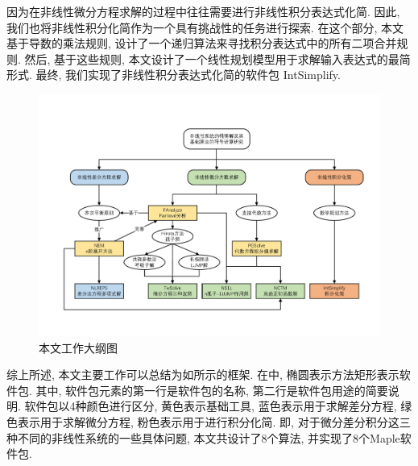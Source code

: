 因为在非线性微分方程求解的过程中往往需要进行非线性积分表达式化简. 因此, 我们也将非线性积分化简作为一个具有挑战性的任务进行探索. 在这个部分, 本文基于导数的乘法规则, 设计了一个递归算法来寻找积分表达式中的所有二项合并规则. 然后, 基于这些规则, 本文设计了一个线性规划模型用于求解输入表达式的最简形式. 最终, 我们实现了非线性积分表达式化简的软件包 IntSimplify. 

\begin{figure}[htbp]
\includegraphics[width=\textwidth]{fig/outline.pdf}
\caption{本文工作大纲图}\label{outline}
\end{figure}

综上所述, 本文主要工作可以总结为如所示的框架. 在中, 椭圆表示方法\zdh 矩形表示软件包. 其中, 软件包元素的第一行是软件包的名称, 第二行是软件包用途的简要说明. 软件包以4种颜色进行区分, 黄色表示基础工具, 蓝色表示用于求解差分方程, 绿色表示用于求解微分方程, 粉色表示用于进行积分化简. 即, 对于微分\zdh 差分\zdh 积分这三种不同的非线性系统的一些具体问题, 本文共设计了8个算法, 并实现了8个Maple软件包.
